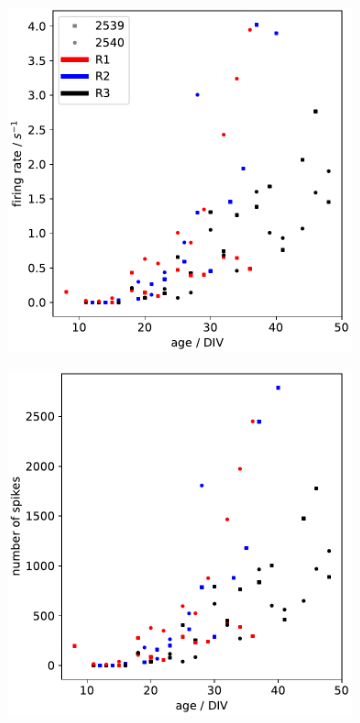 \documentclass[11pt]{article}
\begin{document}
{\begin{figure}
	\centering
\begin{subfigure}[b]{0.45\textwidth}
	\centering
	\includegraphics[width=\textwidth]{../plots/development_plots_fr.pdf}
\end{subfigure}
\hfill
\begin{subfigure}[b]{0.45\textwidth}
	\centering
	\includegraphics[width=\textwidth]{../plots/development_plots_n.pdf}
\end{subfigure}


\end{figure}}
\end{document}
